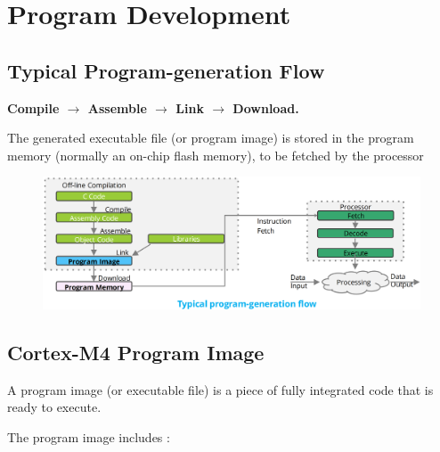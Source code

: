\chapter{Program Development}

\section{Typical Program-generation Flow}

\begin{center}
    \textbf{Compile $\rightarrow$ Assemble $\rightarrow$ Link $\rightarrow$ Download.}
\end{center}


The generated executable file (or program image) is stored in the program
memory (normally an on-chip flash memory), to be fetched by the processor

\begin{figure}[H]
    \centering
    \includegraphics[width=0.85\linewidth]{img/image28.png}
\end{figure}

\section{Cortex-M4 Program Image}

A program image (or executable file) is a piece of fully integrated code that is ready to execute.


The program image includes :

